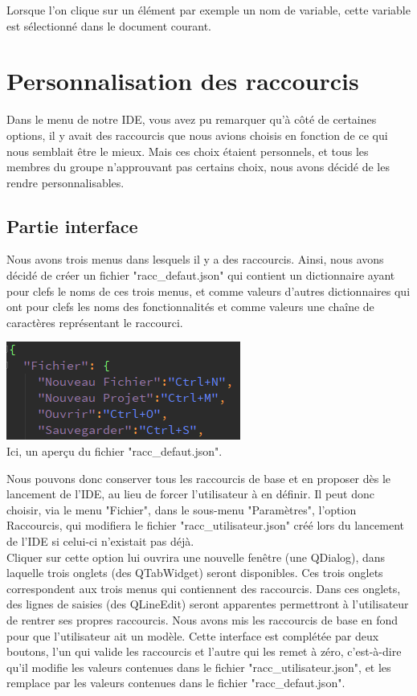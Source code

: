 \documentclass[a4paper,12pt]{article}
\begin{document}
	Lorsque l'on clique sur un élément par exemple un nom de variable, cette variable est sélectionné dans le document courant.
	
	\newpage

\section{Personnalisation des raccourcis}

	Dans le menu de notre IDE, vous avez pu remarquer qu'à côté de certaines options, il y avait des raccourcis que nous avions choisis en fonction de ce qui nous semblait être le mieux. Mais ces choix étaient personnels, et tous les membres du groupe n'approuvant pas certains choix, nous avons décidé de les rendre personnalisables.

	\subsection{Partie interface}

	Nous avons trois menus dans lesquels il y a des raccourcis. Ainsi, nous avons décidé de créer un fichier "racc\_defaut.json" qui contient un dictionnaire ayant pour clefs le noms de ces trois menus, et comme valeurs d'autres dictionnaires qui ont pour clefs les noms des fonctionnalités et comme valeurs une chaîne de caractères représentant le raccourci.

\begin{center}
	\includegraphics[scale=0.5]{images/imgs_racc/ex_1.png}\\
	Ici, un aperçu du fichier "racc\_defaut.json".
\end{center}

	Nous pouvons donc conserver tous les raccourcis de base et en proposer dès le lancement de l'IDE, au lieu de forcer l'utilisateur à en définir. Il peut donc choisir, via le menu "Fichier", dans le sous-menu "Paramètres", l'option Raccourcis, qui modifiera le fichier "racc\_utilisateur.json" créé lors du lancement de l'IDE si celui-ci n'existait pas déjà.\\

	Cliquer sur cette option lui ouvrira une nouvelle fenêtre (une QDialog), dans laquelle trois onglets (des QTabWidget) seront disponibles. Ces trois onglets correspondent aux trois menus qui contiennent des raccourcis. Dans ces onglets, des lignes de saisies (des QLineEdit) seront apparentes permettront à l'utilisateur de rentrer ses propres raccourcis. Nous avons mis les raccourcis de base en fond pour que l'utilisateur ait un modèle. Cette interface est complétée par deux boutons, l'un qui valide les raccourcis et l'autre qui les remet à zéro, c'est-à-dire qu'il modifie les valeurs contenues dans le fichier "racc\_utilisateur.json",  et les remplace par les valeurs contenues dans le fichier "racc\_defaut.json".
\end{document}
